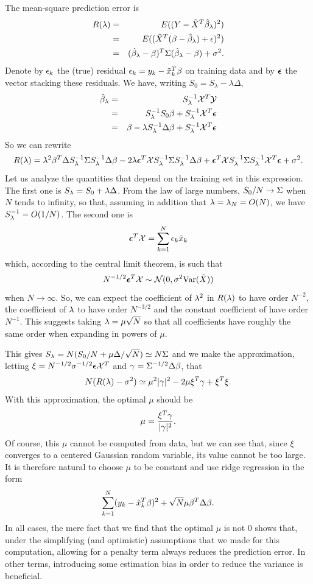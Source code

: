 The mean-square prediction error is 
\begin{eqnarray*}
R(\lambda) &=& E((Y - {\tilde{X}}^T \hat{\beta}_\lambda)^2)\\
& =& E(({\tilde{X}}^T(\beta - \hat{\beta}_\lambda) + \epsilon)^2)\\
&=& (\hat{\beta}_\lambda- \beta)^T \Sigma (\hat{\beta}_\lambda - \beta) + \sigma^2.
\end{eqnarray*}
Denote by $\epsilon_k$ the (true) residual $\epsilon_k = y_k -
{\tilde{x}}_k^T \beta$ on training data and by $\bm{\epsilon}$ the vector stacking these residuals.
We have, writing $S_0 = S_\lambda - \lambda\Delta$, 
\begin{eqnarray*}
\hat{\beta}_\lambda &=& S_\lambda^{-1}{\mathcal X}^T{\mathcal Y} \\
&=& S_\lambda^{-1}S_0 \beta + S_\lambda^{-1}{\mathcal X}^T\bm{\epsilon}\\
&=& \beta - \lambda S_\lambda^{-1}\Delta \beta + S_\lambda^{-1}{\mathcal X}^T\bm{\epsilon}
\end{eqnarray*}
So we can rewrite
$$
R(\lambda) = \lambda^2 \beta^T \Delta S_\lambda^{-1} \Sigma S_\lambda^{-1} \Delta \beta -2\lambda \bm{\epsilon}^T{\mathcal X}
S_\lambda^{-1} \Sigma S_\lambda^{-1}\Delta \beta + \bm{\epsilon}^T{\mathcal X} S_\lambda^{-1} \Sigma
S_\lambda^{-1} {\mathcal X}^T\bm{\epsilon} + \sigma^2.
$$
Let us analyze the quantities that depend on the training set in this
expression. The first one is $S_\lambda = S_0 + \lambda \Delta$. From the law of
large numbers, $S_0/N \to \Sigma$ when $N$ tends to infinity, so that, assuming in addition that $\lambda=\lambda_N = O(N)$, we have
$S_\lambda^{-1} = O(1/N)$. The second one is 
$$
\bm{\epsilon}^T{\mathcal X} = \sum_{k=1}^N \epsilon_k {\tilde{x}}_k
$$
which, according to the central limit theorem, is such that
\[
N^{-1/2}\bm{\epsilon}^T{\mathcal X} \sim {\mathcal N}(0, \sigma^2 \text{Var}({\tilde{X}}))
\]
 when
$N\to\infty$. So, we can expect the coefficient of $\lambda^2$  in
$R(\lambda)$ to have order $N^{-2}$, the coefficient of $\lambda$ to have
order $N^{-3/2}$ and the constant coefficient of have order
$N^{-1}$. This suggests taking $\lambda = \mu \sqrt{N}$ so that all
coefficients have roughly the same order when expanding in powers of
$\mu$. 

This gives $S_\lambda = N(S_0/N + \mu\Delta/\sqrt N) \simeq N\Sigma$ and we 
make the approximation, letting $\xi = N^{-1/2} \sigma^{-1/2}\bm{\epsilon} {\mathcal X}^T$
and $\gamma = \Sigma^{-1/2} \Delta\beta$, that
$$
N(R(\lambda) - \sigma^2) \simeq \mu^2  |\gamma|^2 - 2 \mu \xi^T
\gamma  + \xi^T \xi.
$$
With this approximation, the optimal $\mu$ should be 
$$
\mu = \frac{\xi^T\gamma}{|\gamma|^2}.
$$
Of course, this $\mu$ cannot be computed from  data, but we can see
that, since $\xi$ converges to a centered Gaussian random variable,
its value cannot be too large. It is therefore natural to choose $\mu$ to 
be constant and use ridge regression in the form
$$
\sum_{k=1}^N (y_k - \tilde x_k^T \beta)^2 + \sqrt N\mu \beta^T \Delta \beta.
$$ 
In all cases, the mere fact that we find that the optimal $\mu$ is not 0 shows that, under the simplifying (and optimistic) assumptions that we made for this computation, allowing for a penalty term always reduces the prediction error.  In other terms, introducing some estimation bias in order to reduce the variance is beneficial.


